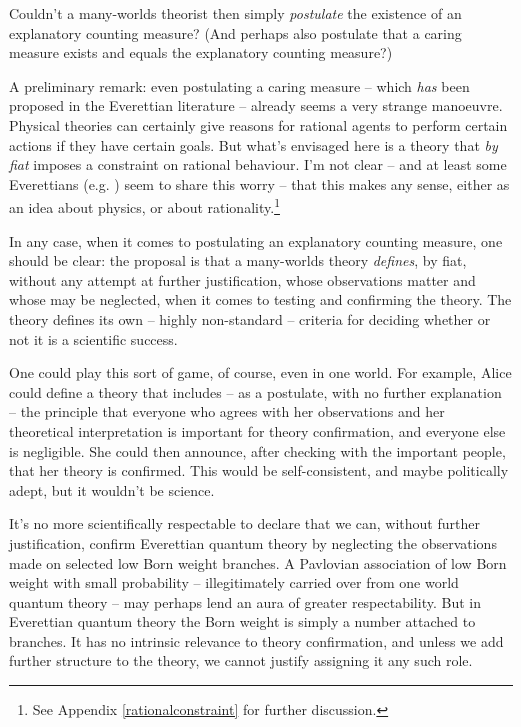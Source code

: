 \documentclass[aps,
pra,epsfig,12pt]{revtex4}
\begin{document}
Couldn't a many-worlds theorist then simply {\it postulate}
the existence of an explanatory counting measure?   (And perhaps also  
postulate that a caring measure exists and equals the explanatory
counting measure?) 

A preliminary remark: even postulating a caring measure -- which 
{\it has} been 
proposed \cite{papineauvol} in the Everettian literature -- already
seems a very strange manoeuvre.  Physical theories can certainly give 
reasons for rational agents to perform certain actions if they
have certain goals.   But what's envisaged here is a theory
that {\it by fiat} imposes a constraint on rational behaviour.  I'm 
not clear -- and at least some Everettians (e.g. \cite{saundersvol})
seem to share this worry -- 
that this makes any sense, either as an idea about
physics, or about rationality.\footnote{See Appendix \ref{rationalconstraint}
for further discussion.}

In any case, when it comes to postulating an explanatory
counting measure, one should be clear: the proposal is  
that a many-worlds theory {\it defines}, by fiat, without any attempt
at further justification, whose observations matter and whose may
be neglected, when it comes to testing and confirming the theory.  
The theory defines its own -- highly 
non-standard -- criteria for deciding whether or not it is
a scientific success.  

One could play this sort of game, of course, even in one world.  
For example,
Alice could define a theory that includes -- as a postulate, with no further 
explanation -- the principle that everyone who agrees 
with her observations and her theoretical interpretation is important
for theory confirmation, and everyone else is negligible.   
She could then announce, after checking with the important people, that 
her theory is confirmed.
This would be self-consistent, and maybe politically adept, but it 
wouldn't be science.  

It's no more scientifically respectable to declare that we can, without
further justification, confirm Everettian quantum theory by 
neglecting the observations made on selected low Born weight branches.
A Pavlovian association of low Born weight 
with small probability --  illegitimately carried
over from one world quantum theory -- may perhaps lend an
aura of greater respectability.   
But in Everettian quantum theory the Born weight is 
simply a number attached to branches.  
It has no intrinsic relevance to theory confirmation, and unless we add 
further structure to the theory, we cannot justify assigning it any such 
role.   
\end{document}
